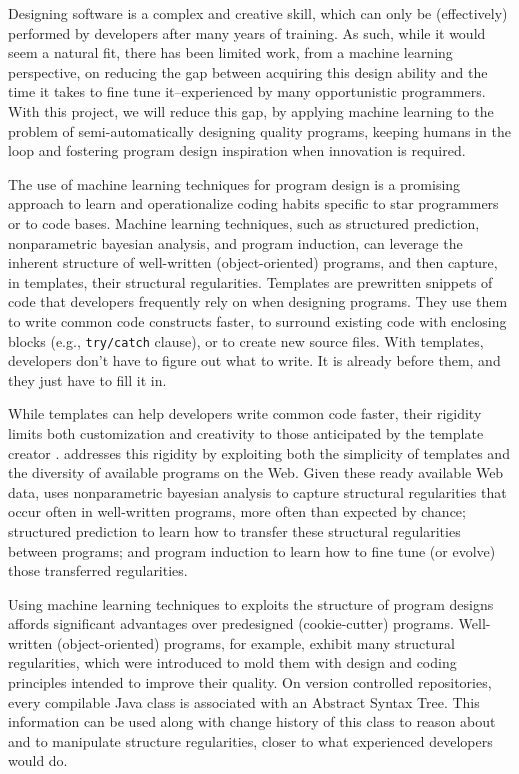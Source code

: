 Designing software is a complex and creative skill, which can only be
(effectively) performed by developers after many years of training. As such,
while it would seem a natural fit, there has been limited work, from a machine
learning perspective, on reducing the gap between acquiring this design ability
and the time it takes to fine tune it--experienced by many opportunistic
programmers. With this project, we will reduce this gap, by applying machine
learning to the problem of semi-automatically designing quality programs,
keeping humans in the loop and fostering program design inspiration when
innovation is required.

The use of machine learning techniques for program design is a promising
approach to learn and operationalize coding habits specific to star programmers
or to code bases. Machine learning techniques, such as structured prediction,
nonparametric bayesian analysis, and program induction, can leverage the
inherent structure of well-written (object-oriented) programs, and then capture,
in templates, their structural regularities. Templates are prewritten snippets
of code that developers frequently rely on when designing programs. They use
them to write common code constructs faster, to surround existing code with
enclosing blocks (e.g., \texttt{try/catch} clause), or to create new source
files. With templates, developers don't have to figure out what to write. It is
already before them, and they just have to fill it in.

While templates can help developers write common code faster, their rigidity
limits both customization and creativity to those anticipated by the template
creator \cite{Kumar2011-hy}. \pdm addresses this rigidity by exploiting both the
simplicity of templates and the diversity of available programs on the Web.
Given these ready available Web data, \pdm uses nonparametric bayesian analysis
\cite{allamanis2014mining} to capture structural regularities that occur often
in well-written programs, more often than expected by chance; structured
prediction \cite{collins2002discriminative} to learn how to transfer these
structural regularities between programs; and program induction
\cite{lake2015human} to learn how to fine tune (or evolve) those transferred
regularities.

Using machine learning techniques to exploits the structure of program
designs affords significant advantages over predesigned (cookie-cutter)
programs. Well-written (object-oriented) programs, for example, exhibit many
structural regularities, which were introduced to mold them with design and
coding principles intended to improve their quality. On version controlled
repositories, every compilable Java class is associated with an Abstract Syntax
Tree. This information can be used along with change history of this class to
reason about and to manipulate structure regularities, closer to what
experienced developers would do.

